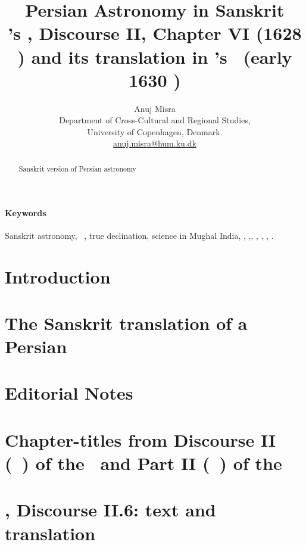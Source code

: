 \documentclass[10pt, a4paper, oneside]{memoir}
\title{Persian Astronomy in Sanskrit\\[5pt]
\MullaFarid's \ZijiShahJahani, Discourse II, Chapter VI (1628 \ce) and its translation in \Nityananda's \Siddhantasindhu\ (\circa early 1630 \ce)}
\author{Anuj Misra\\[10pt]

{\small Department of Cross-Cultural and Regional Studies,}\\{\small University of Copenhagen, Denmark.}\\{\small \url{anuj.misra@hum.ku.dk}}}
\date{}
\begin{document}
\sloppy
\sloppybottom
\thispagestyle{empty}

\maketitle
\bigskip

\begin{abstract}
Sanskrit version of Persian astronomy
\end{abstract}
\vfill
 \paragraph{Keywords} Sanskrit astronomy, \ganita\ \jyotisa, true declination, science in Mughal India, \Nityananda, \MullaFarid,, \Sarvasiddhantaraja, \Siddhantasindhu, \ZijiShahJahani, \ZijUlughBeg. 
 \vfill
\clearpage
\tableofcontents*
\clearpage

\section{Introduction}\label{introduction}

 \clearpage

\section{The Sanskrit translation of a Persian \zij} \label{sanskrit_translation_of_persian_zij}

\clearpage

\section{Editorial Notes}\label{editoial_notes}

\clearpage

\section[Chapter-titles from the \ZijiShahJahani, Discourse~II and the\linebreak \Siddhantasindhu, Part~II: text and translation]{Chapter-titles from Discourse II (\maqala\idafaconsonant\ \duvum) of the \ZijiShahJahani\ and Part II (\dvitiya\ \kanda) of the \Siddhantasindhu}\label{chapter_title_comparision_persian_sanskrit}

\clearpage

\section{\ZijiShahJahani, Discourse II.6: text and translation}
\label{zijshahjahan_persian_english}

\clearpage
% 
% 
\end{document}
